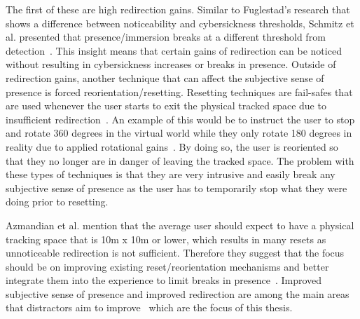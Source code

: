 The first of these are high redirection gains. Similar to Fuglestad's research that shows a difference between noticeability and cybersickness thresholds, Schmitz et al. presented that presence/immersion breaks at a different threshold from detection~\cite{schmitz2018you}. This insight means that certain gains of redirection can be noticed without resulting in cybersickness increases or breaks in presence.
Outside of redirection gains, another technique that can affect the subjective sense of presence is forced reorientation/resetting. Resetting techniques are fail-safes that are used whenever the user starts to exit the physical tracked space due to insufficient redirection~\cite{williams2007exploring}. An example of this would be to instruct the user to stop and rotate 360 degrees in the virtual world while they only rotate 180 degrees in reality due to applied rotational gains~\cite{suma2012taxonomy}. By doing so, the user is reoriented so that they no longer are in danger of leaving the tracked space. The problem with these types of techniques is that they are very intrusive and easily break any subjective sense of presence as the user has to temporarily stop what they were doing prior to resetting. 

Azmandian et al. mention that the average user should expect to have a physical tracking space that is 10m x 10m or lower, which results in many resets as unnoticeable redirection is not sufficient. Therefore they suggest that the focus should be on improving existing reset/reorientation mechanisms and better integrate them into the experience to limit breaks in presence~\cite{azmandian2015physical}. Improved subjective sense of presence and improved redirection are among the main areas that distractors aim to improve~\cite{peck2009evaluation, peck2011evaluation} which are the focus of this thesis.

